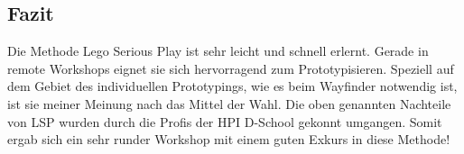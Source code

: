 \pagebreak

\subsection{Fazit}

Die Methode Lego Serious Play ist sehr leicht und schnell erlernt. Gerade in remote Workshops eignet sie sich hervorragend zum Prototypisieren. Speziell auf dem Gebiet des individuellen Prototypings, wie es beim Wayfinder notwendig ist, ist sie meiner Meinung nach das Mittel der Wahl. Die oben genannten Nachteile von LSP wurden durch die Profis der HPI D-School gekonnt umgangen. Somit ergab sich ein sehr runder Workshop mit einem guten Exkurs in diese Methode!